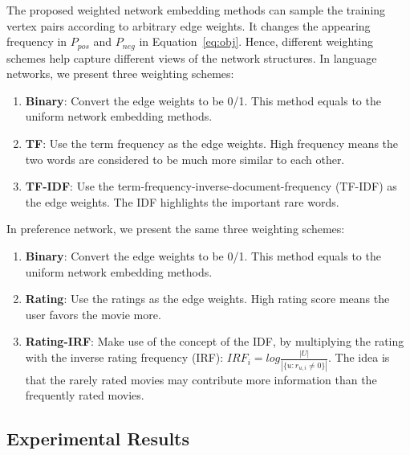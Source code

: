 The proposed weighted network embedding methods can sample the training vertex pairs according to arbitrary edge weights. It changes the appearing frequency in $P_{pos}$ and $P_{neg}$ in Equation~\ref{eq:obj}. Hence, different weighting schemes help capture different views of the network structures.  In language networks, we present three weighting schemes:
\begin{enumerate}
  \item \textbf{Binary}: Convert the edge weights to be 0/1.  This method equals to the uniform network embedding methods.
  \item \textbf{TF}: Use the term frequency as the edge weights.  High frequency means the two words are considered to be much more similar to each other.
  \item \textbf{TF-IDF}: Use the term-frequency-inverse-document-frequency (TF-IDF) as the edge weights.  The IDF highlights the important rare words.
\end{enumerate}
In preference network, we present the same three weighting schemes:
\begin{enumerate}
  \item \textbf{Binary}: Convert the edge weights to be 0/1.  This method equals to the uniform network embedding methods.
  \item \textbf{Rating}: Use the ratings as the edge weights.  High rating score means the user favors the movie more.
  \item \textbf{Rating-IRF}: Make use of the concept of the IDF, by multiplying the rating with the inverse rating frequency (IRF): $IRF_{i} = log\frac{|U|}{|\{u:r_{u,i}\neq 0\}|}$. The idea is that the rarely rated movies may contribute more information than the frequently rated movies.
\end{enumerate}

\subsection{Experimental Results}

